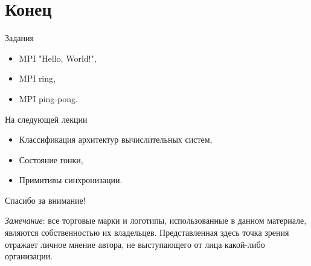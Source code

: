 \section{Конец}

\begin{frame}{Задания}

\begin{itemize}
    \item MPI "Hello, World!",
    \item MPI ring,
    \item MPI ping-pong.
\end{itemize}

\end{frame}

\begin{frame}{На следующей лекции}

\begin{itemize}
    \item Классификация архитектур вычислительных систем,
    \item Состояние гонки,
    \item Примитивы синхронизации.
\end{itemize}

\end{frame}

\begin{frame}

{\huge{Спасибо за внимание!}\par}

\vfill

\tiny{\textit{Замечание}: все торговые марки и логотипы, использованные в данном материале, являются собственностью их владельцев. Представленная здесь точка зрения отражает личное мнение автора, не выступающего от лица какой-либо организации.}

\end{frame}


